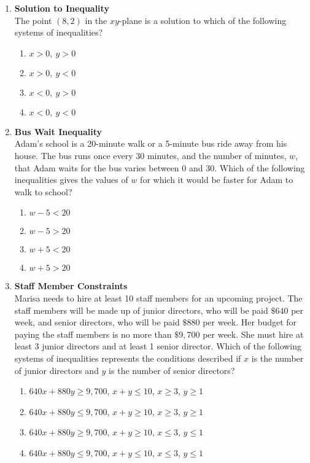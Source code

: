 \begin{enumerate}
\item \textbf{Solution to Inequality}\\
The point $(8,2)$ in the $xy$-plane is a solution to which of the following systems of inequalities?
\begin{enumerate}[label=(\Alph*)]
  \item $x > 0,\ y > 0$
  \item $x > 0,\ y < 0$
  \item $x < 0,\ y > 0$
  \item $x < 0,\ y < 0$
\end{enumerate}


\begin{subanswer}
\end{subanswer}

\item \textbf{Bus Wait Inequality}\\
Adam's school is a 20-minute walk or a 5-minute bus ride away from his house. The bus runs once every 30 minutes, and the number of minutes, $w$, that Adam waits for the bus varies between 0 and 30. Which of the following inequalities gives the values of $w$ for which it would be faster for Adam to walk to school?
\begin{enumerate}[label=(\Alph*)]
  \item $w - 5 < 20$
  \item $w - 5 > 20$
  \item $w + 5 < 20$
  \item $w + 5 > 20$
\end{enumerate}
\begin{subanswer}
\end{subanswer}

\newpage

\item \textbf{Staff Member Constraints}\\
Marisa needs to hire at least 10 staff members for an upcoming project. The staff members will be made up of junior directors, who will be paid $\$ 640$ per week, and senior directors, who will be paid $\$ 880$ per week. Her budget for paying the staff members is no more than $\$ 9,700$ per week. She must hire at least 3 junior directors and at least 1 senior director. Which of the following systems of inequalities represents the conditions described if $x$ is the number of junior directors and $y$ is the number of senior directors?
\begin{enumerate}[label=(\Alph*)]
  \item $640x + 880y \geq 9,\!700$, $x + y \leq 10$, $x \geq 3$, $y \geq 1$
  \item $640x + 880y \leq 9,\!700$, $x + y \geq 10$, $x \geq 3$, $y \geq 1$
  \item $640x + 880y \geq 9,\!700$, $x + y \geq 10$, $x \leq 3$, $y \leq 1$
  \item $640x + 880y \leq 9,\!700$, $x + y \leq 10$, $x \leq 3$, $y \leq 1$
\end{enumerate}


\end{enumerate}

